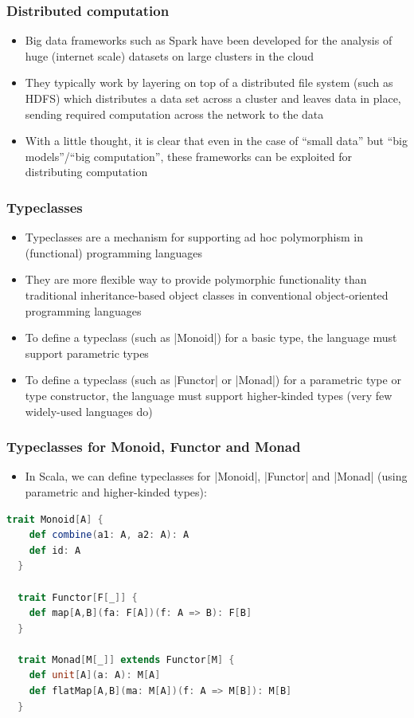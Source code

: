 \documentclass[mathserif,handout]{beamer}
\begin{document}
\begin{frame}[fragile]
  \frametitle{Distributed computation}
  \begin{itemize}
  \item Big data frameworks such as Spark have been developed for the analysis of huge (internet scale) datasets on large clusters in the cloud
  \item They typically work by layering on top of a distributed file system (such as HDFS) which distributes a data set across a cluster and leaves data in place, sending required computation across the network to the data
    \item With a little thought, it is clear that even in the case of ``small data'' but ``big models''/``big computation'', these frameworks can be exploited for distributing computation
  \end{itemize}
\end{frame}

\begin{frame}[fragile]
  \frametitle{Typeclasses}
  \begin{itemize}
  \item \alert{Typeclasses} are a mechanism for supporting \alert{ad hoc polymorphism} in (functional) programming languages
  \item They are more flexible way to provide polymorphic functionality than traditional inheritance-based object classes in conventional object-oriented programming languages
  \item To define a typeclass (such as |Monoid|) for a basic type, the language must support \alert{parametric types}
  \item To define a typeclass (such as |Functor| or |Monad|) for a parametric type or type constructor, the language must support \alert{higher-kinded types} (very few widely-used languages do)
  \end{itemize}
\end{frame}


\begin{frame}[fragile]
  \frametitle{Typeclasses for Monoid, Functor and Monad}
  \begin{itemize}
  \item In Scala, we can define typeclasses for |Monoid|, |Functor| and |Monad| (using parametric and higher-kinded types):
  \end{itemize}
  \begin{lstlisting}[language=scala]
  trait Monoid[A] {
    def combine(a1: A, a2: A): A
    def id: A
  }
    
  trait Functor[F[_]] {
    def map[A,B](fa: F[A])(f: A => B): F[B]
  }

  trait Monad[M[_]] extends Functor[M] {
    def unit[A](a: A): M[A]
    def flatMap[A,B](ma: M[A])(f: A => M[B]): M[B]
  }
\end{lstlisting}
\end{frame}
\end{document}
